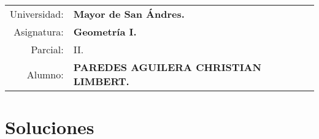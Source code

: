 \documentclass[10pt]{article}
\begin{document}
\begin{tabular}{r l }
Universidad: & \textbf{Mayor de San Ándres.}\\
Asignatura: & \textbf{Geometría I.}\\
 Parcial: & II.\\ Alumno: & \textbf{PAREDES AGUILERA CHRISTIAN LIMBERT.}
\end{tabular}
\begin{flushleft}
\end{flushleft}

\section*{\center Soluciones}
\end{document}
